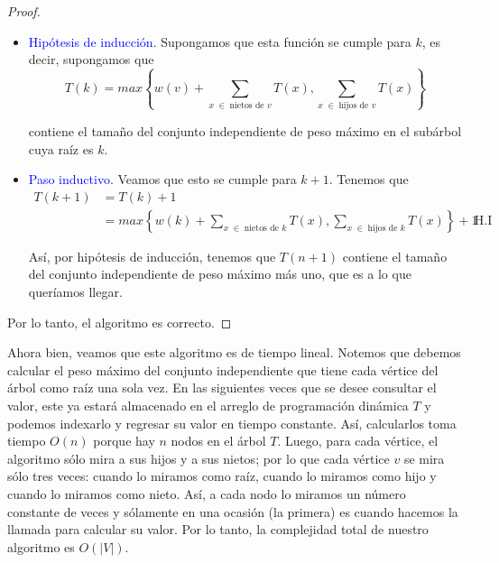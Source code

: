 \documentclass[letterpaper,11pt]{article}
\begin{document}
\begin{enumerate}
\begin{proof}
\begin{itemize}
            \item \textcolor{blue}{Hipótesis de inducción}. Supongamos que 
            esta función se cumple para $k$, es decir, supongamos que 
            \begin{equation*}
                T(k) = max \left\{w(v) + \sum_{x \; \in \;
                \text{nietos de $v$}} T(x), \sum_{x \; \in \; 
                \text{hijos de $v$}} T(x) \right\} 
            \end{equation*}

            contiene el tamaño del conjunto independiente de peso máximo en 
            el subárbol cuya raíz es $k$.

            \item \textcolor{blue}{Paso inductivo}. Veamos que esto se cumple 
            para $k+1$. Tenemos que 
            \begin{align*}
                T(k+1) 
                &= T(k) + 1 \\
                &= max \left\{w(k) + \sum_{x \; \in \; \text{nietos de $k$}} 
                T(x), \sum_{x \; \in \; \text{hijos de $k$}} T(x) \right\}
                + 1 
                && \text{H.I}
            \end{align*}

            Así, por hipótesis de inducción, tenemos que $T(n+1)$ contiene el 
            tamaño del conjunto independiente de peso máximo más uno, que es 
            a lo que queríamos llegar.
        \end{itemize}

        Por lo tanto, el algoritmo es correcto.
        
    \end{proof}

    Ahora bien, veamos que este algoritmo es de tiempo lineal. Notemos que 
    debemos calcular el peso máximo del conjunto independiente que tiene cada 
    vértice del árbol como raíz una sola vez. En las siguientes veces que se
    desee consultar el valor, este ya estará almacenado en el arreglo de 
    programación dinámica $T$ y podemos indexarlo y regresar su valor en 
    tiempo constante. Así, calcularlos toma tiempo $O(n)$ porque hay $n$ nodos 
    en el árbol $T$. Luego, para cada vértice, el algoritmo sólo mira a sus 
    hijos y a sus nietos; por lo que cada vértice $v$ se mira sólo tres veces:
    cuando lo miramos como raíz, cuando lo miramos como hijo y cuando lo 
    miramos como nieto. Así, a cada nodo lo miramos un número constante de 
    veces y sólamente en una ocasión (la primera) es cuando hacemos la llamada 
    para calcular su valor. Por lo tanto, la complejidad total de nuestro 
    algoritmo es $O(|V|)$. 


\end{enumerate}
\end{document}
